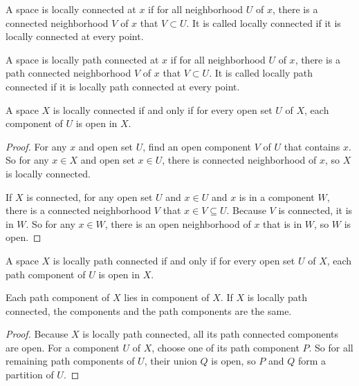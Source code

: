 \begin{definition}
    A space is locally connected at $x$ if for all neighborhood $U$ of $x$, there is a connected neighborhood $V$ of $x$ that $V \subset U$. It is called locally connected if it is locally connected at every point.
\end{definition}

\begin{definition}
    A space is locally path connected at $x$ if for all neighborhood $U$ of $x$, there is a path connected neighborhood $V$ of $x$ that $V \subset U$. It is called locally path connected if it is locally path connected at every point.
\end{definition}

\begin{theorem}
A space $X$ is locally connected if and only if for every open set $U$ of $X$, each component of $U$ is open in $X$.    
\end{theorem}
\begin{proof}
    For any $x$ and open set $U$, find an open component $V$ of $U$ that contains $x$. So for any $x \in X$ and open set $x \in U$, there is connected neighborhood of $x$, so $X$ is locally connected.
    
    If $X$ is connected, for any open set $U$ and $x \in U$ and $x$ is in a component $W$, there is a connected neighborhood $V$ that $x \in V \subseteq U$. Because $V$ is connected, it is in $W$. So for any $x \in W$, there is an open neighborhood of $x$ that is in $W$, so $W$ is open.
\end{proof}

\begin{theorem}
A space $X$ is locally path connected if and only if for every open set $U$ of $X$, each path component of $U$ is open in $X$.    
\end{theorem}

\begin{theorem}
    Each path component of $X$ lies in component of $X$. If $X$ is locally path connected, the components and the path components are the same.    
\end{theorem}
\begin{proof}
    Because $X$ is locally path connected, all its path connected components are open. For a component $U$ of $X$, choose one of its path component $P$. So for all remaining path components of $U$, their union $Q$ is open, so $P$ and $Q$ form a partition of $U$.
\end{proof}
















